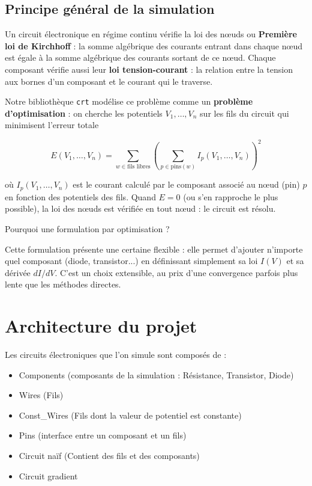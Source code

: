 \documentclass[12pt,a4paper]{article}
\begin{document}
\subsection{Principe général de la simulation}

Un circuit électronique en régime continu vérifie la loi des nœuds ou \textbf{Première loi de Kirchhoff} : 
la somme algébrique des courants entrant dans chaque nœud est égale à la somme algébrique des courants sortant de ce nœud. 
Chaque composant vérifie aussi leur \textbf{loi tension-courant} : la relation entre la tension aux bornes d'un composant et le courant qui le traverse.

Notre bibliothèque \texttt{crt} modélise ce problème comme un \textbf{problème d'optimisation} :
on cherche les potentiels $V_1, \ldots, V_n$ sur les fils du circuit qui minimisent l'erreur totale

\[
  E(V_1, \ldots, V_n) = \sum_{w \in \text{fils libres}} \left(\sum_{p \in \text{pins}(w)} I_p(V_1, \ldots, V_n)\right)^2
\]

où $I_p(V_1, \ldots, V_n)$ est le courant calculé par le composant associé au nœud (pin) $p$ en fonction des potentiels des fils.
Quand $E = 0$ (ou s'en rapproche le plus possible), la loi des nœuds est vérifiée en tout nœud : le circuit est résolu.

\begin{infobox}{Pourquoi une formulation par optimisation ?}

  Cette formulation présente une certaine flexible : elle permet d'ajouter n'importe quel composant (diode, transistor...) en définissant 
  simplement sa loi $I(V)$ et sa dérivée $dI/dV$.
  C'est un choix extensible, au prix d'une convergence parfois plus lente
  que les méthodes directes.

\end{infobox}


\section{Architecture du projet}


Les circuits électroniques que l'on simule sont composés de :
\begin{itemize}
    \item Components (composants de la simulation : Résistance, Transistor, Diode)
    \item Wires (Fils)
    \item Const\_Wires (Fils dont la valeur de potentiel est constante)
    \item Pins (interface entre un composant et un fils)
    \item Circuit naïf (Contient des fils et des composants)
    \item Circuit gradient
\end{itemize}
\end{document}
